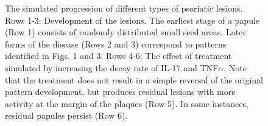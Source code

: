 \begin{figure}[p]
	\centering
	\caption{The simulated progression of different types of psoriatic lesions. Rows 1-3: Development of the lesions. The earliest stage of a papule (Row 1) consists of randomly distributed small seed areas. Later forms of the disease (Rows 2 and 3) correspond to patterns identified in Figs. 1 and 3. Rows 4-6: The effect of treatment simulated by increasing the decay rate of IL-17 and TNF$\alpha$. Note that the treatment does not result in a simple reversal of the original pattern development, but produces residual lesions with more activity at the margin of the plaques (Row 5). In some instances, residual papules persist (Row 6).}
	\label{fig:4}
\end{figure}

\newpage

